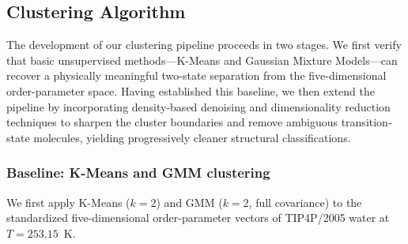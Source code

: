 \documentclass[aps, amsmath,amssymb, reprint, onecolumn,notitlepage,superscriptaddress]{revtex4-2}
\begin{document}
\subsection{Clustering Algorithm}
The development of our clustering pipeline proceeds in two stages. We first verify that basic unsupervised methods---K-Means and Gaussian Mixture Models---can recover a physically meaningful two-state separation from the five-dimensional order-parameter space. Having established this baseline, we then extend the pipeline by incorporating density-based denoising and dimensionality reduction techniques to sharpen the cluster boundaries and remove ambiguous transition-state molecules, yielding progressively cleaner structural classifications.

\subsubsection{Baseline: K-Means and GMM clustering}
\label{sec:baseline}
We first apply K-Means ($k = 2$) and GMM ($k = 2$, full covariance) to the
standardized five-dimensional order-parameter vectors of TIP4P/2005 water at
$T = 253.15$~K.
\end{document}
